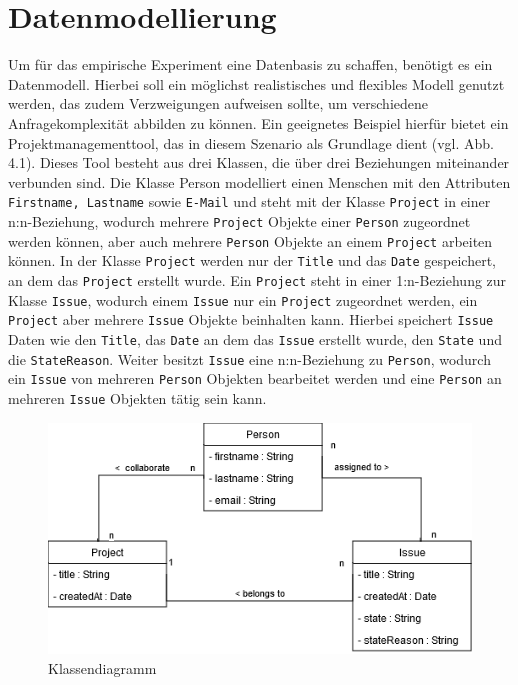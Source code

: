 \chapter{Datenmodellierung} %
\label{sec:datamodelling}
Um für das empirische Experiment eine Datenbasis zu schaffen, benötigt es ein Datenmodell. Hierbei soll ein möglichst realistisches und flexibles Modell genutzt werden, das zudem Verzweigungen aufweisen sollte, um verschiedene Anfragekomplexität abbilden zu können. Ein geeignetes Beispiel hierfür bietet ein Projektmanagementtool, das in diesem Szenario als Grundlage dient (vgl. Abb. 4.1). Dieses Tool besteht aus drei Klassen, die über drei Beziehungen miteinander verbunden sind. Die Klasse Person modelliert einen Menschen mit den Attributen \texttt{Firstname, Lastname} sowie \texttt{E-Mail} und steht mit der Klasse \texttt{Project} in einer n:n-Beziehung, wodurch mehrere 
\texttt{Project} Objekte einer \texttt{Person} zugeordnet werden können, aber auch mehrere \texttt{Person} Objekte an einem \texttt{Project} arbeiten können. In der Klasse \texttt{Project} werden nur der \texttt{Title} und das \texttt{Date} gespeichert, an dem das \texttt{Project} erstellt wurde. Ein \texttt{Project} steht in einer 1:n-Beziehung zur Klasse \texttt{Issue}, wodurch einem \texttt{Issue} nur ein \texttt{Project} zugeordnet werden, ein \texttt{Project} aber mehrere \texttt{Issue} Objekte beinhalten kann. Hierbei speichert \texttt{Issue} Daten wie den \texttt{Title}, das \texttt{Date} an dem das \texttt{Issue} erstellt wurde, den \texttt{State} und die \texttt{StateReason}. Weiter besitzt \texttt{Issue} eine n:n-Beziehung zu \texttt{Person}, wodurch ein \texttt{Issue} von mehreren \texttt{Person} Objekten bearbeitet werden und eine \texttt{Person} an mehreren \texttt{Issue} Objekten tätig sein kann.
\vspace{1cm}
\label{sec:datenmodell}
\begin{figure}[h!]
	\centering
	\includegraphics[scale=.8]{Illustrations/class_diagram.png}
	\caption{Klassendiagramm}
\end{figure}



